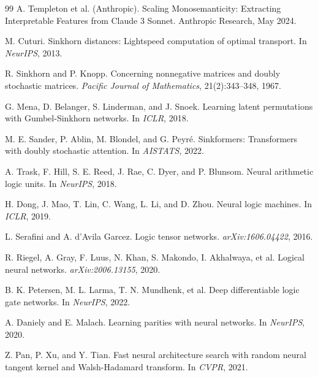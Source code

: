 \documentclass[Royal,times,sageh]{sagej}
\begin{document}
\begin{thebibliography}{99}
A. Templeton et al. (Anthropic).
\newblock Scaling Monosemanticity: Extracting Interpretable Features from Claude 3 Sonnet.
\newblock Anthropic Research, May 2024.

M. Cuturi.
\newblock Sinkhorn distances: Lightspeed computation of optimal transport.
\newblock In \textit{NeurIPS}, 2013.

R. Sinkhorn and P. Knopp.
\newblock Concerning nonnegative matrices and doubly stochastic matrices.
\newblock \textit{Pacific Journal of Mathematics}, 21(2):343--348, 1967.

G. Mena, D. Belanger, S. Linderman, and J. Snoek.
\newblock Learning latent permutations with Gumbel-Sinkhorn networks.
\newblock In \textit{ICLR}, 2018.

M. E. Sander, P. Ablin, M. Blondel, and G. Peyré.
\newblock Sinkformers: Transformers with doubly stochastic attention.
\newblock In \textit{AISTATS}, 2022.

A. Trask, F. Hill, S. E. Reed, J. Rae, C. Dyer, and P. Blunsom.
\newblock Neural arithmetic logic units.
\newblock In \textit{NeurIPS}, 2018.

H. Dong, J. Mao, T. Lin, C. Wang, L. Li, and D. Zhou.
\newblock Neural logic machines.
\newblock In \textit{ICLR}, 2019.

L. Serafini and A. d'Avila Garcez.
\newblock Logic tensor networks.
\newblock \textit{arXiv:1606.04422}, 2016.

R. Riegel, A. Gray, F. Luus, N. Khan, S. Makondo, I. Akhalwaya, et al.
\newblock Logical neural networks.
\newblock \textit{arXiv:2006.13155}, 2020.

B. K. Petersen, M. L. Larma, T. N. Mundhenk, et al.
\newblock Deep differentiable logic gate networks.
\newblock In \textit{NeurIPS}, 2022.

A. Daniely and E. Malach.
\newblock Learning parities with neural networks.
\newblock In \textit{NeurIPS}, 2020.

Z. Pan, P. Xu, and Y. Tian.
\newblock Fast neural architecture search with random neural tangent kernel and Walsh-Hadamard transform.
\newblock In \textit{CVPR}, 2021.


\end{thebibliography}
\end{document}
